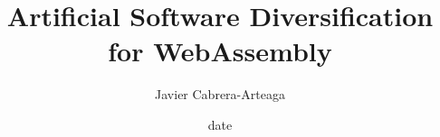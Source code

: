 
\title{ Artificial Software Diversification for WebAssembly }
\author{Javier Cabrera-Arteaga }
\date{date}


\address{KTH Royal Institute of Technology \\School of Electrical Engineering and Computer Science\\ Division of Software and Computer Systems \\ SE-10044 Stockholm\\ Sweden}
